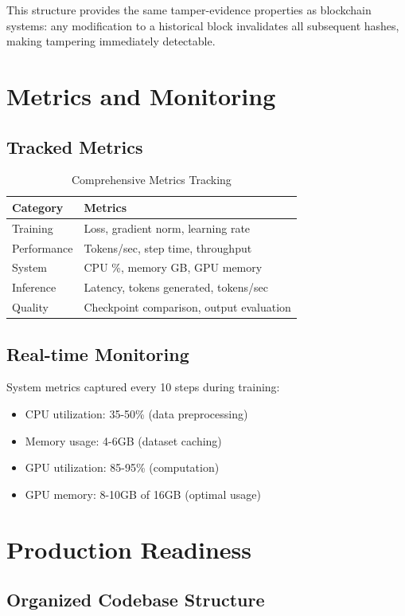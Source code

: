 \documentclass[11pt,a4paper]{article}
\begin{document}
This structure provides the same tamper-evidence properties as blockchain systems: any modification to a historical block invalidates all subsequent hashes, making tampering immediately detectable.

\section{Metrics and Monitoring}

\subsection{Tracked Metrics}

\begin{table}[H]
\centering
\begin{tabular}{ll}
\toprule
\textbf{Category} & \textbf{Metrics} \\
\midrule
Training & Loss, gradient norm, learning rate \\
Performance & Tokens/sec, step time, throughput \\
System & CPU \%, memory GB, GPU memory \\
Inference & Latency, tokens generated, tokens/sec \\
Quality & Checkpoint comparison, output evaluation \\
\bottomrule
\end{tabular}
\caption{Comprehensive Metrics Tracking}
\label{tab:metrics}
\end{table}

\subsection{Real-time Monitoring}
System metrics captured every 10 steps during training:
\begin{itemize}
    \item CPU utilization: 35-50\% (data preprocessing)
    \item Memory usage: 4-6GB (dataset caching)
    \item GPU utilization: 85-95\% (computation)
    \item GPU memory: 8-10GB of 16GB (optimal usage)
\end{itemize}

\section{Production Readiness}

\subsection{Organized Codebase Structure}
\end{document}
